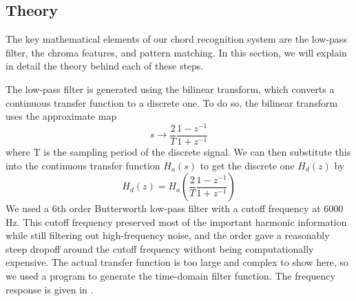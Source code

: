 \documentclass[journal]{IEEEtran}
\begin{document}
\subsection{Theory}
The key mathematical elements of our chord recognition system are the low-pass filter, the chroma features, and pattern matching.
In this section, we will explain in detail the theory behind each of these steps.

The low-pass filter is generated using the bilinear transform, which converts a continuous transfer function to a discrete one.
To do so, the bilinear transform uses the approximate map
\begin{equation}
    s \to \frac{2}{T}\frac{1 - z^{-1}}{1 + z^{-1}}
    \label{eq:s_to_z}
\end{equation}
where T is the sampling period of the discrete signal.
We can then substitute this into the continuous transfer function $H_a(s)$ to get the discrete one $H_d(z)$ by 
\begin{equation}
    H_d(z) = H_a\left(\frac{2}{T}\frac{1 - z^{-1}}{1 + z^{-1}}\right)
    \label{eq:bilinear}
\end{equation}
We used a 6th order Butterworth low-pass filter with a cutoff frequency at 6000 Hz.
This cutoff frequency preserved most of the important harmonic information while still filtering out high-frequency noise, and the order gave a reasonably steep dropoff around the cutoff frequency without being computationally expensive.
The actual transfer function is too large and complex to show here, so we used a program to generate the time-domain filter function.
The frequency response is given in .
\end{document}

